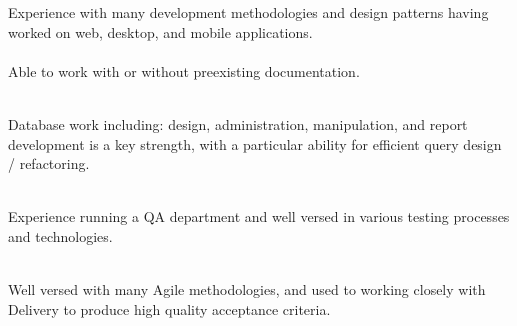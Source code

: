 \documentclass[12pt]{developercv} %
\begin{document}
\begin{minipage}[t]{0.7\textwidth}
	\vspace{-\baselineskip} %
	

	
	Experience with many development methodologies and design patterns having worked on web, desktop, and mobile applications.\\\\
	Able to work with or without preexisting documentation.
	
	\vspace{\baselineskip}


	\\

	Database work including: design, administration, manipulation, and report development is a key strength, with a particular ability for efficient query design / refactoring.
	



	\vspace{\baselineskip}


	\\

	Experience running a QA department and well versed in various testing processes and technologies.


\vspace{\baselineskip}
	\\
	
	Well versed with many Agile methodologies, and used to working closely with Delivery to produce high quality acceptance criteria.


\end{minipage}
\end{document}

